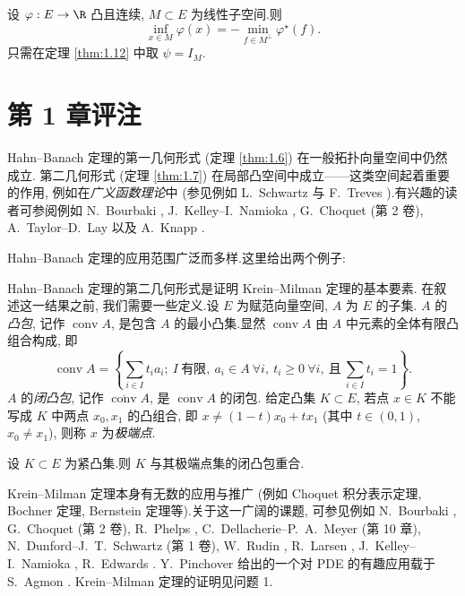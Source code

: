 \begin{example}
设 $\varphi:E\to\R$ 凸且连续, $M\subset E$ 为线性子空间.则
\begin{equation*}
\inf_{x\in M}\varphi(x)=-\min_{f\in M^\perp}\varphi^\star(f).
\end{equation*}
只需在定理  \ref{thm:1.12} 中取 $\psi=I_M$.
\end{example}

\section*{第 1 章评注}

Hahn--Banach 定理的第一几何形式 (定理  \ref{thm:1.6}) 在一般拓扑向量空间中仍然成立.
第二几何形式 (定理  \ref{thm:1.7}) 在局部凸空间中成立——这类空间起着重要的作用,
例如在\emph{广义函数理论}中 (参见例如 L.~Schwartz  与
F.~Treves ).有兴趣的读者可参阅例如 N.~Bourbaki , J.~Kelley--I.~Namioka , G.~Choquet 
(第 2 卷), A.~Taylor--D.~Lay  以及 A.~Knapp .

Hahn--Banach 定理的应用范围广泛而多样.这里给出两个例子:

Hahn--Banach 定理的第二几何形式是证明 Krein--Milman 定理的基本要素.
在叙述这一结果之前, 我们需要一些定义.设 $E$ 为赋范向量空间, $A$ 为 $E$ 的子集.
$A$ 的\emph{凸包}, 记作 $\operatorname{conv}A$, 是包含 $A$ 的最小凸集.显然
$\operatorname{conv}A$ 由 $A$ 中元素的全体有限凸组合构成, 即
\begin{equation*}
\operatorname{conv}A=\left\{\sum_{i\in I}t_ia_i;\ I\ \text{有限},\ a_i\in A\ \forall i,\
t_i\ge 0\ \forall i,\ \text{且}\ \sum_{i\in I}t_i=1\right\}.
\end{equation*}
$A$ 的\emph{闭凸包}, 记作 $\overline{\operatorname{conv}}A$, 是 $\operatorname{conv}A$ 的闭包.
给定凸集 $K\subset E$, 若点 $x\in K$ 不能写成 $K$ 中两点 $x_0,x_1$ 的凸组合, 即
$x\ne(1-t)x_0+tx_1$ (其中 $t\in(0,1)$, $x_0\ne x_1$), 则称 $x$ 为\emph{极端点}.

\begin{keytheorem}
\label{thm:1.13}
设 $K\subset E$ 为紧凸集.则 $K$ 与其极端点集的闭凸包重合.
\end{keytheorem}

Krein--Milman 定理本身有无数的应用与推广 (例如 Choquet 积分表示定理, Bochner 定理, Bernstein 定理等).关于这一广阔的课题, 可参见例如 N.~Bourbaki , G.~Choquet  (第 2 卷), R.~Phelps , C.~Dellacherie--P.~A.~Meyer  (第 10 章), N.~Dunford--J.~T.~Schwartz  (第 1 卷), W.~Rudin , R.~Larsen , J.~Kelley--I.~Namioka , R.~Edwards .
Y.~Pinchover 给出的一个对 PDE 的有趣应用载于 S.~Agmon \bref{Agmon}{2}.
Krein--Milman 定理的证明见问题 1.

